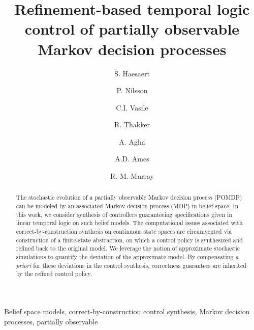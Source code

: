 \documentclass{ifacconf}
\begin{document}
\begin{frontmatter}

\title{\huge Refinement-based temporal logic control of partially observable Markov decision processes }

\author[cal]{S. Haesaert}
\author[cal]{P. Nilsson}
\author[mit]{C.I. Vasile}
\author[jpl]{R. Thakker}
\author[jpl]{A. Agha}
\author[cal]{A.D.  Ames}
\author[cal]{R. M. Murray}



\address[cal]{California Institute of Technology,
   Pasadena, CA 91125 USA} %
\address[mit]{Massachusetts Institute of Technology,
   Cambridge, MA 02139 USA}%
\address[jpl]{Jet Propulsion Laboratory,
   Pasadena, CA 91109 USA}%
\maketitle
\begin{abstract}
The stochastic evolution of a partially observable Markov decision process (POMDP) can be modeled by an associated Markov decision process (MDP) in belief space.
In this work, we consider synthesis of controllers guaranteeing  specifications given in linear temporal logic on such belief models. The computational issues associated with correct-by-construction synthesis on continuous state spaces are circumvented via construction of a finite-state abstraction, on which a control policy is synthesized and refined back to the original model. We leverage the notion of approximate stochastic simulations to quantify the deviation of the approximate model. By compensating {\it a priori} for these deviations in the control synthesis, correctness guarantees are inherited by the refined control policy.
\end{abstract}
\begin{keyword} Belief space models,
correct-by-construction control synthesis, Markov decision processes, partially observable
\end{keyword}

\end{frontmatter}
\end{document}
